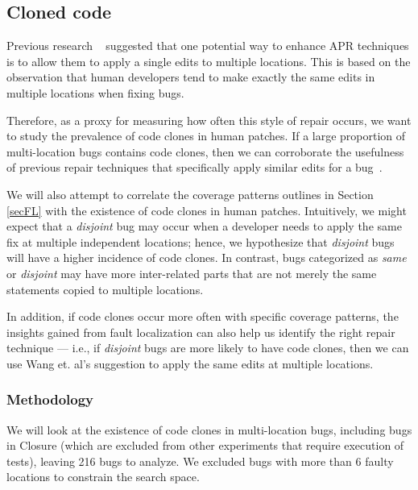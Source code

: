 \documentclass[sigconf, timestamp-false, anonymous=true]{acmart}
\begin{document}
\subsection{Cloned code}


Previous research ~\cite{wang2018} suggested that one potential way to enhance
APR techniques is to allow them to apply a single edits to multiple locations.
This is based on the observation that human developers tend to make exactly the 
same edits in multiple locations when fixing bugs. 

Therefore, as a proxy for measuring how often this style of repair occurs, we want to study the
prevalence of code clones in human patches. If a large proportion of multi-location bugs contains code 
clones, then we can corroborate the usefulness of previous repair techniques that specifically apply 
similar 
edits for a bug~\cite{saha2019harnessing}.

We will also attempt to correlate the coverage patterns outlines in Section \ref{secFL} with the 
existence of 
code clones in 
human patches. Intuitively, we might expect that a \emph{disjoint} bug may occur when a developer 
needs 
to apply the same fix at multiple independent locations; hence, we hypothesize that \emph{disjoint} 
bugs 
will have a higher incidence of code clones. In contrast, bugs categorized as \emph{same} or 
\emph{disjoint} may have more inter-related parts that are not merely the same statements copied to 
multiple locations.

In addition, if code clones occur more often with specific coverage patterns, the insights gained from 
fault 
localization can also help us identify the right repair technique --- i.e., if \emph{disjoint} bugs are more 
likely to have code clones, then we can use Wang et. al's suggestion to apply the same edits at multiple 
locations.


\subsubsection{Methodology}
\label{sec52}
We will look at the existence of code clones in multi-location bugs, including bugs in Closure (which are 
excluded from other experiments that require execution of tests), leaving 216 bugs to analyze. We 
excluded bugs with more than 6 faulty locations to constrain the search space.
\end{document}
